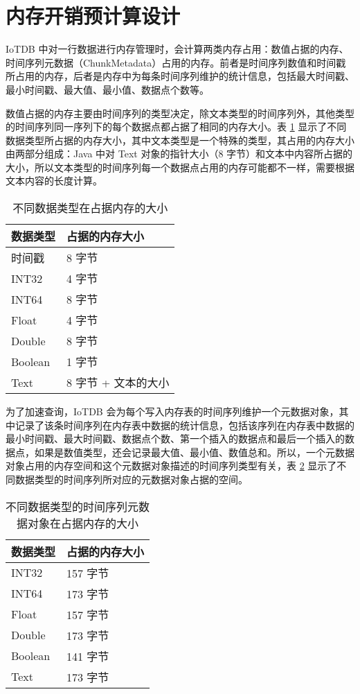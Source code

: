 \section{内存开销预计算设计}
IoTDB 中对一行数据进行内存管理时，会计算两类内存占用：数值占据的内存、时间序列元数据（ChunkMetadata）占用的内存。前者是时间序列数值和时间戳所占用的内存，后者是内存中为每条时间序列维护的统计信息，包括最大时间戳、最小时间戳、最大值、最小值、数据点个数等。

数值占据的内存主要由时间序列的类型决定，除文本类型的时间序列外，其他类型的时间序列同一序列下的每个数据点都占据了相同的内存大小。表 \ref{fig:data-type-mem-size} 显示了不同数据类型所占据的内存大小，其中文本类型是一个特殊的类型，其占用的内存大小由两部分组成：Java 中对 Text 对象的指针大小（8 字节）和文本中内容所占据的大小，所以文本类型的时间序列每一个数据点占用的内存可能都不一样，需要根据文本内容的长度计算。
\begin{table}
  \centering
  \caption{不同数据类型在占据内存的大小}
  \begin{tabular}{ll}
    \toprule
    数据类型 & 占据的内存大小 \\
    \midrule
    时间戳 & 8 字节 \\
    INT32 & 4 字节 \\
    INT64 & 8 字节 \\
    Float & 4 字节 \\
    Double & 8 字节\\
    Boolean & 1 字节 \\
    Text & 8 字节 + 文本的大小 \\
    \bottomrule
  \end{tabular}
  \label{fig:data-type-mem-size}
\end{table}

为了加速查询，IoTDB 会为每个写入内存表的时间序列维护一个元数据对象，其中记录了该条时间序列在内存表中数据的统计信息，包括该序列在内存表中数据的最小时间戳、最大时间戳、数据点个数、第一个插入的数据点和最后一个插入的数据点，如果是数值类型，还会记录最大值、最小值、数值总和。所以，一个元数据对象占用的内存空间和这个元数据对象描述的时间序列类型有关，表 \ref{fig:data-type-statistic-mem-size} 显示了不同数据类型的时间序列所对应的元数据对象占据的空间。

\begin{table}
  \centering
  \caption{不同数据类型的时间序列元数据对象在占据内存的大小}
  \begin{tabular}{ll}
    \toprule
    数据类型 & 占据的内存大小 \\
    \midrule
    INT32 & 157 字节 \\
    INT64 & 173 字节 \\
    Float & 157 字节 \\
    Double & 173 字节\\
    Boolean & 141 字节 \\
    Text & 173 字节 \\
    \bottomrule
  \end{tabular}
  \label{fig:data-type-statistic-mem-size}
\end{table}

